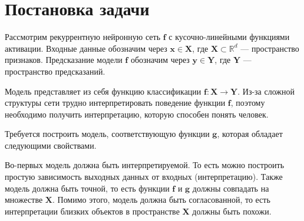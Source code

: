 \documentclass[12pt]{article}
\begin{document}
\section{Постановка задачи}
Рассмотрим рекуррентную нейронную сеть $\mathbf{f}$ с кусочно-линейными функциями активации. Входные данные обозначим через $\mathbf{x} \in \mathbf{X}$, где $\mathbf{X} \subset \mathbb{R}^d$ --- пространство признаков. Предсказание модели $\mathbf{f}$ обозначим через $\mathbf{y} \in \mathbf{Y}$, где $\mathbf{Y}$ --- пространство предсказаний.

Модель представляет из себя функцию классификации $\mathbf{f}: \mathbf{X} \to \mathbf{Y}$. Из-за сложной структуры сети трудно интерпретировать поведение функции $\mathbf{f}$, поэтому необходимо получить интерпретацию, которую способен понять человек.

Требуется построить модель, соответствующую функции $\mathbf{g}$, которая обладает следующими свойствами.

Во-первых модель должна быть интерпретируемой. То есть можно построить простую зависимость выходных данных от входных (интерпретацию). Также модель должна быть точной, то есть функции $\mathbf{f}$ и $\mathbf{g}$ должны совпадать на множестве $\mathbf{X}$. Помимо этого, модель должна быть согласованной, то есть интерпретации близких объектов в пространстве $\mathbf{X}$ должны быть похожи.



\end{document}

